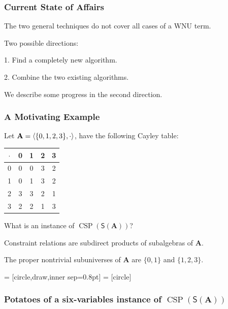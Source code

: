 \documentclass[10pt,xcolor=dvipsnames%
   ]{beamer}
\DeclareMathOperator{\CSP}{CSP}
\renewcommand{\.}{\cdot}
\newcommand{\sansS}{\ensuremath{\mathsf{S}}}
\newcommand{\bA}{\ensuremath{\mathbf{A}}}
\begin{document}
\begin{frame}
\frametitle{Current State of Affairs}
The two general techniques do not cover all cases of a WNU term. 

\medskip
Two possible directions:

1. Find a completely new algorithm.

2. Combine the two existing algorithms.

We describe some progress in the second direction.
\end{frame}


\begin{frame}
\frametitle{A Motivating Example}
Let $\bA = \<\{0,1,2,3\}, \cdot \>$, have the following Cayley table:

\begin{center}
 \begin{tabular}{c|cccc}
      $\cdot $ & 0 & 1 & 2 & 3\\
      \hline
      0 & 0 & 0 & 3& 2\\
      1 & 0 & 1 & 3& 2\\
      2 & 3 & 3 & 2 & 1\\
      3 & 2 & 2 & 1 & 3
 \end{tabular}
\end{center}

What is an instance of $\CSP(\sansS(\bA))$?

Constraint relations are subdirect products of subalgebras of $\bA$.

The proper nontrivial subuniverses of $\bA$ are $\{0,1\}$ and $\{1,2,3\}$.

\end{frame}

\begin{frame}
  \newcommand{\bS}{\ensuremath{\mathbf{S}}}
  \newcommand{\bSq}{\ensuremath{\mathbf{Sq}}}


   = [circle,draw,inner sep=0.8pt]
   = [circle]
  \frametitle{Potatoes of a six-variables instance of $\CSP(\sansS (\bA))$}
  \begin{center}
  \end{center}

\end{frame}
\end{document}
